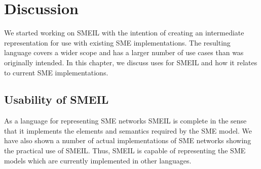 \chapter{Discussion}


We started working on SMEIL with the intention of creating an intermediate
representation for use with existing SME implementations. The resulting language
covers a wider scope and has a larger number of use cases than was originally
intended. In this chapter, we discuss uses for SMEIL and how it relates to
current SME implementations.






\section{Usability of SMEIL}
As a language for representing SME networks SMEIL is complete in the sense that
it implements the elements and semantics required by the SME model. We have also
shown a number of actual implementations of SME networks showing the practical
use of SMEIL. Thus, SMEIL is capable of representing the SME models which are
currently implemented in other languages.

